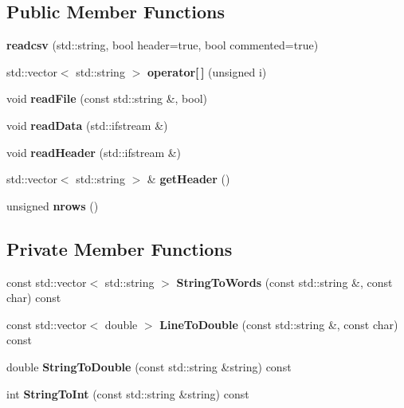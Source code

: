 \subsection*{Public Member Functions}
\begin{DoxyCompactItemize}
\item 
\mbox{\label{classreadcsv_aa54ddf1101a8f8ab341fefd53bcfa800}} 
{\bfseries readcsv} (std\+::string, bool header=true, bool commented=true)
\item 
\mbox{\label{classreadcsv_a1334e39bd41afbdd8a1d494d23c65a43}} 
std\+::vector$<$ std\+::string $>$ {\bfseries operator\mbox{[}$\,$\mbox{]}} (unsigned i)
\item 
\mbox{\label{classreadcsv_a6ed1061ac00e32b2db88df7ffc8ce3ed}} 
void {\bfseries read\+File} (const std\+::string \&, bool)
\item 
\mbox{\label{classreadcsv_a9296a02467fd317c09b72280cb34aff5}} 
void {\bfseries read\+Data} (std\+::ifstream \&)
\item 
\mbox{\label{classreadcsv_a790283b0e5a8c927c6fc21c99bfc7db3}} 
void {\bfseries read\+Header} (std\+::ifstream \&)
\item 
\mbox{\label{classreadcsv_a738276a30d4f0f01e70a62765ebab3c2}} 
std\+::vector$<$ std\+::string $>$ \& {\bfseries get\+Header} ()
\item 
\mbox{\label{classreadcsv_af5a63a92698cf6a511d90e8fe66c1d85}} 
unsigned {\bfseries nrows} ()
\end{DoxyCompactItemize}
\subsection*{Private Member Functions}
\begin{DoxyCompactItemize}
\item 
\mbox{\label{classreadcsv_a9d68415134bb866f2162a6f993d5aae2}} 
const std\+::vector$<$ std\+::string $>$ {\bfseries String\+To\+Words} (const std\+::string \&, const char) const
\item 
\mbox{\label{classreadcsv_af74454e2364f534458e58767bd2074e3}} 
const std\+::vector$<$ double $>$ {\bfseries Line\+To\+Double} (const std\+::string \&, const char) const
\item 
\mbox{\label{classreadcsv_a7e904a604d14230497bd13c479ebffd8}} 
double {\bfseries String\+To\+Double} (const std\+::string \&string) const
\item 
\mbox{\label{classreadcsv_a2332d4c46f12bfb30cf4302019eccf24}} 
int {\bfseries String\+To\+Int} (const std\+::string \&string) const
\end{DoxyCompactItemize}
